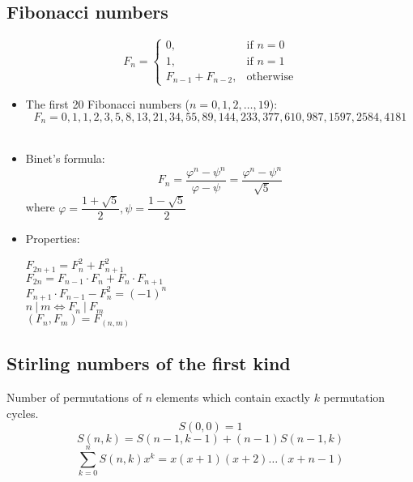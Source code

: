 \subsection{Fibonacci numbers}
\[ F_{n} =
  \begin{cases}
    0, & \text{if } n = 0 \\
    1, & \text{if } n = 1 \\
    F_{n - 1} + F_{n - 2}, & \text{otherwise}
  \end{cases}
\]
\begin{itemize}
  \item The first 20 Fibonacci numbers ($n = 0, 1, 2, \ldots, 19$):
    \[ F_n = 0, 1, 1, 2, 3, 5, 8, 13, 21, 34, 55, 89, 144, 233, 377, 610, 987, 1597, 2584, 4181 \]\
  \item Binet's formula:
    \[F_n = \frac{\varphi^n - \psi^n}{\varphi - \psi} = \frac{\varphi^n - \psi^n}{\sqrt{5}}\]
    where $\varphi = \dfrac{1 + \sqrt{5}}{2}, \psi = \dfrac{1 - \sqrt{5}}{2}$
  \item Properties:
  \begin{multicols*}{2}
    $F_{2n + 1} = F_{n}^2 + F_{n + 1}^2$ \\
    $F_{2n} = F_{n - 1} \cdot F_{n} + F_{n} \cdot F_{n + 1}$ \\
    $F_{n + 1} \cdot F_{n - 1} - F_{n}^2 = (-1)^{n}$ \\
    $n\ |\ m \iff F_{n}\ |\ F_{m}$ \\
    $(F_{n}, F_{m}) = F_{(n, m)}$
  \end{multicols*}
\end{itemize}

\subsection{Stirling numbers of the first kind}
Number of permutations of $n$ elements which contain exactly $k$ permutation cycles.
\[S(0, 0) = 1\]
\[S(n, k) = S(n - 1, k - 1) + (n - 1)S(n - 1, k)\]
\[\sum\limits_{k = 0}^{n}{S(n, k)x^k = x(x + 1)(x + 2)\ldots(x + n - 1)}\]

